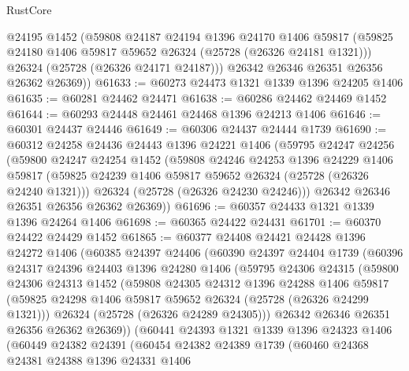 \begin{lexlean}{RustCore}
\begin{coremodule}
        @24195
        @1452
        (@59808
          @24187
          @24194
          @1396
          @24170
          @1406
          @59817
          (@59825 @24180 @1406 @59817 @59652 @26324 (@25728 (@26326 @24181 @1321)))
          @26324
          (@25728 (@26326 @24171 @24187)))
        @26342
        @26346
        @26351
        @26356
        @26362
        @26369))
@61633 := @60273 @24473 @1321 @1339 @1396 @24205 @1406
@61635 := @60281 @24462 @24471
@61638 := @60286 @24462 @24469 @1452
@61644 := @60293 @24448 @24461 @24468 @1396 @24213 @1406
@61646 := @60301 @24437 @24446
@61649 := @60306 @24437 @24444 @1739
@61690 := @60312
    @24258
    @24436
    @24443
    @1396
    @24221
    @1406
    (@59795
      @24247
      @24256
      (@59800
        @24247
        @24254
        @1452
        (@59808
          @24246
          @24253
          @1396
          @24229
          @1406
          @59817
          (@59825 @24239 @1406 @59817 @59652 @26324 (@25728 (@26326 @24240 @1321)))
          @26324
          (@25728 (@26326 @24230 @24246)))
        @26342
        @26346
        @26351
        @26356
        @26362
        @26369))
@61696 := @60357 @24433 @1321 @1339 @1396 @24264 @1406
@61698 := @60365 @24422 @24431
@61701 := @60370 @24422 @24429 @1452
@61865 := @60377
    @24408
    @24421
    @24428
    @1396
    @24272
    @1406
    (@60385
      @24397
      @24406
      (@60390
        @24397
        @24404
        @1739
        (@60396
          @24317
          @24396
          @24403
          @1396
          @24280
          @1406
          (@59795
            @24306
            @24315
            (@59800
              @24306
              @24313
              @1452
              (@59808
                @24305
                @24312
                @1396
                @24288
                @1406
                @59817
                (@59825 @24298 @1406 @59817 @59652 @26324 (@25728 (@26326 @24299 @1321)))
                @26324
                (@25728 (@26326 @24289 @24305)))
              @26342
              @26346
              @26351
              @26356
              @26362
              @26369))
          (@60441
            @24393
            @1321
            @1339
            @1396
            @24323
            @1406
            (@60449
              @24382
              @24391
              (@60454
                @24382
                @24389
                @1739
                (@60460
                  @24368
                  @24381
                  @24388
                  @1396
                  @24331
                  @1406

\end{coremodule}
\end{lexlean}
